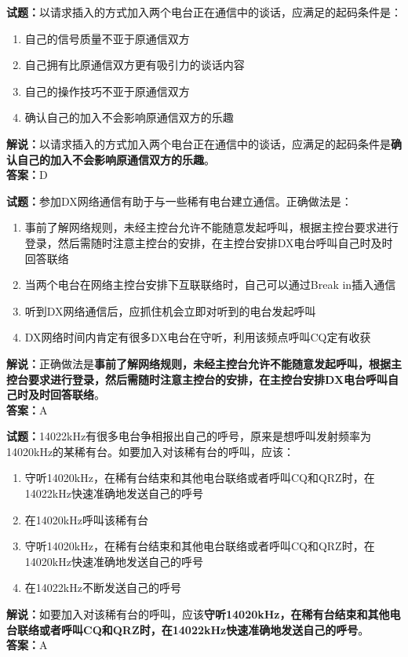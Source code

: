 \documentclass{ctexbook}
\begin{document}
\noindent\textbf{试题：}以请求插入的方式加入两个电台正在通信中的谈话，应满足的起码条件是：
\begin{enumerate}[leftmargin=3em]
\item 自己的信号质量不亚于原通信双方
\item 自己拥有比原通信双方更有吸引力的谈话内容
\item 自己的操作技巧不亚于原通信双方
\item 确认自己的加入不会影响原通信双方的乐趣
\end{enumerate}
\noindent\textbf{解说：}以请求插入的方式加入两个电台正在通信中的谈话，应满足的起码条件是\textbf{确认自己的加入不会影响原通信双方的乐趣}。\\\noindent\textbf{答案：}D



\bigskip


\noindent\textbf{试题：}参加DX网络通信有助于与一些稀有电台建立通信。正确做法是：
\begin{enumerate}[leftmargin=3em]
\item 事前了解网络规则，未经主控台允许不能随意发起呼叫，根据主控台要求进行登录，然后需随时注意主控台的安排，在主控台安排DX电台呼叫自己时及时回答联络
\item 当两个电台在网络主控台安排下互联联络时，自己可以通过Break in插入通信
\item 听到DX网络通信后，应抓住机会立即对听到的电台发起呼叫
\item DX网络时间内肯定有很多DX电台在守听，利用该频点呼叫CQ定有收获
\end{enumerate}
\noindent\textbf{解说：}正确做法是\textbf{事前了解网络规则，未经主控台允许不能随意发起呼叫，根据主控台要求进行登录，然后需随时注意主控台的安排，在主控台安排DX电台呼叫自己时及时回答联络}。\\\noindent\textbf{答案：}A



\bigskip


\noindent\textbf{试题：}14022\si{\kHz}有很多电台争相报出自己的呼号，原来是想呼叫发射频率为14020\si{\kHz}的某稀有台。如要加入对该稀有台的呼叫，应该：
\begin{enumerate}[leftmargin=3em]
\item 守听14020\si{\kHz}，在稀有台结束和其他电台联络或者呼叫CQ和QRZ时，在14022\si{\kHz}快速准确地发送自己的呼号
\item 在14020\si{\kHz}呼叫该稀有台
\item 守听14020\si{\kHz}，在稀有台结束和其他电台联络或者呼叫CQ和QRZ时，在14020\si{\kHz}快速准确地发送自己的呼号
\item 在14022\si{\kHz}不断发送自己的呼号
\end{enumerate}
\noindent\textbf{解说：}如要加入对该稀有台的呼叫，应该\textbf{守听14020\si{\kHz}，在稀有台结束和其他电台联络或者呼叫CQ和QRZ时，在14022\si{\kHz}快速准确地发送自己的呼号}。\\\noindent\textbf{答案：}A
\end{document}
